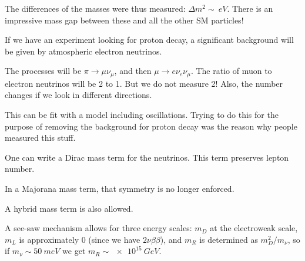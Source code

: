 \documentclass[main.tex]{subfiles}
\begin{document}
The differences of the masses were thus measured: \(\Delta m^2 \sim \SI{}{eV}\). 
There is an impressive mass gap between these and all the other SM particles! 

If we have an experiment looking for proton decay, a significant background will be given by atmospheric electron neutrinos.

The processes will be \(\pi \to \mu \nu _\mu \), and then \(\mu \to e \nu _e \nu _\mu \).
The ratio of muon to electron neutrinos will be 2 to 1. 
But we do not measure 2! 
Also, the number changes if we look in different directions. 

This can be fit with a model including oscillations. 
Trying to do this for the purpose of removing the background for proton decay was the reason why people measured this stuff. 

One can write a Dirac mass term for the neutrinos. 
This term preserves lepton number. 

In a Majorana mass term, that symmetry is no longer enforced. 

A hybrid mass term is also allowed. 

A see-saw mechanism allows for three energy scales: \(m_D\) at the electroweak scale, \(m_L\) is approximately 0 (since we have \(2 \nu \beta \beta \)), and \(m_R\) is determined as \(m_D^2/ m_\nu \), so if \(m_\nu \sim \SI{50}{meV}\) we get \(m_R \sim \SI{e15}{GeV}\). 
\end{document}
